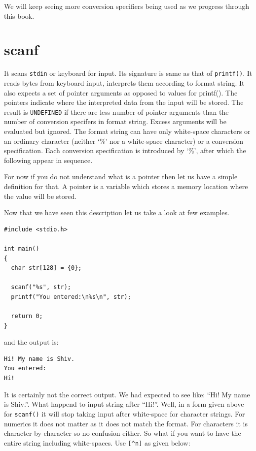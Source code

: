 We will keep seeing more conversion specifiers being used as we progress
through this book.

\section{scanf}
It scans \texttt{stdin} or keyboard for input. Its signature is same as that of
\texttt{printf()}. It reads bytes from keyboard input, interprets them
according to format string. It also expects a set of pointer arguments as
opposed to values for printf(). The pointers indicate where the interpreted
data from the input will be stored. The result is \texttt{UNDEFINED} if there
are less number of pointer arguments than the number of conversion specifers in
format string. Excess arguments will be evaluated but ignored. The format
string can have only white-space characters or an ordinary character (neither
`\%' nor a white-space character) or a conversion specification. Each
conversion specification is introduced by `\%', after which the following
appear in sequence.

For now if you do not understand what is a pointer then let us have a simple
definition for that. A pointer is a variable which stores a memory location
where the value will be stored.

Now that we have seen this description let us take a look at few examples.

\begin{Verbatim}[frame=single]
#include <stdio.h>

int main()
{
  char str[128] = {0};

  scanf("%s", str);
  printf("You entered:\n%s\n", str);

  return 0;
}
\end{Verbatim}

and the output is:

\begin{Verbatim}[frame=single]
Hi! My name is Shiv.
You entered:
Hi!
\end{Verbatim}

It is certainly not the correct output. We had expected to see like: ``Hi! My
name is Shiv.''. What happend to input string after ``Hi!''. Well, in a form
given above for \texttt{scanf()} it will stop taking input after white-space
for character strings. For numerics it does not matter as it does not match the
format. For characters it is character-by-character so no confusion either. So
what if you want to have the entire string including white-spaces. Use
\texttt{[\^{}n]} as given below:

